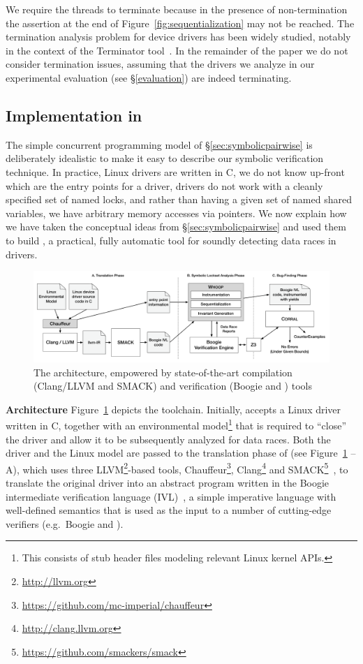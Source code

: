 We require the threads to terminate because in the presence of non-termination the assertion at the end of Figure~\ref{fig:sequentialization} may not be reached.  The termination analysis problem for device drivers has been widely studied, notably in the context of the Terminator tool~\cite{cook2006termination}. In the remainder of the paper we do not consider termination issues, assuming that the drivers we analyze in our experimental evaluation (see \S\ref{evaluation}) are indeed terminating.

\subsection{Implementation in \whoop}
\label{sec:implementation}

The simple concurrent programming model of \S\ref{sec:symbolicpairwise} is deliberately idealistic to make it easy to describe our symbolic verification technique. In practice, Linux drivers are written in C, we do not know up-front which are the entry points for a driver, drivers do not work with a cleanly specified set of named locks, and rather than having a given set of named shared variables, we have arbitrary memory accesses via pointers. We now explain how we have taken the conceptual ideas from \S\ref{sec:symbolicpairwise} and used them to build \whoop, a practical, fully automatic tool for soundly detecting data races in drivers.

\begin{figure}
\centering
\includegraphics[width=.99\linewidth]{img/whoop.pdf}
\caption{The \whoop architecture, empowered by state-of-the-art compilation (Clang/LLVM and SMACK) and verification (Boogie and \corral) tools}
\label{fig:whoop}
\end{figure}

\medskip\noindent\textbf{Architecture }
%
Figure~\ref{fig:whoop} depicts the \whoop toolchain. Initially, \whoop accepts a Linux driver written in C, together with an environmental model\footnote{This consists of stub header files modeling relevant Linux kernel APIs.} that is required to ``close'' the driver and allow it to be subsequently analyzed for data races. Both the driver and the Linux model are passed to the translation phase of \whoop (see Figure~\ref{fig:whoop} -- A), which uses three LLVM\footnote{\url{http://llvm.org}}-based tools, Chauffeur\footnote{\url{https://github.com/mc-imperial/chauffeur}}, Clang\footnote{\url{http://clang.llvm.org}} and SMACK\footnote{\url{https://github.com/smackers/smack}}~\cite{rakamaric2014smack}, to translate the original driver into an abstract program written in the Boogie intermediate verification language (IVL)~\cite{deline2005boogiepl}, a simple imperative language with well-defined semantics that is used as the input to a number of cutting-edge verifiers (e.g.\ Boogie and \corral).

